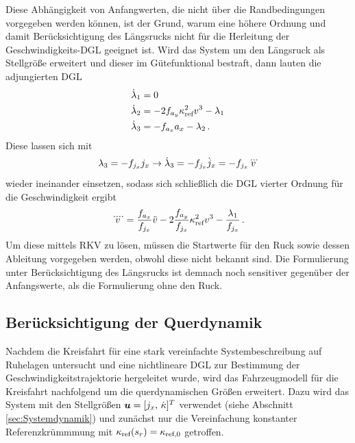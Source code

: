 Diese Abhängigkeit von Anfangwerten, die nicht über die Randbedingungen vorgegeben werden können, ist der Grund, warum eine höhere Ordnung und damit Berücksichtigung des Längsrucks nicht für die Herleitung der Geschwindigkeits-\gls{DGL} geeignet ist. Wird das System um den Längsruck als Stellgröße erweitert und dieser im Gütefunktional bestraft, dann lauten die adjungierten \gls{DGL}
\begin{align}
\dot{\lambda}_1 &= 0 \\
\dot{\lambda}_2 &= -2f_{a_y} \kappa_{\textrm{ref}}^2v^3 - \lambda_1 \\
\dot{\lambda}_3 &= -f_{a_x} a_x - \lambda_2\,.
\end{align}
Diese lassen sich mit 
\begin{equation}
\lambda_3 = -f_{j_x} j_x \rightarrow \dot{\lambda}_3 = -f_{j_x} \dot{j}_x = -f_{j_x} \dddot{v}
\end{equation}
wieder ineinander einsetzen, sodass sich schließlich die \gls{DGL} vierter Ordnung für die Geschwindigkeit ergibt
\begin{equation}
\ddddot{v} = \frac{f_{a_x}}{f_{j_x}}\ddot{v} - 2\frac{f_{a_y}}{f_{j_x}}\kappa_{\textrm{ref}}^2v^3 - \frac{\lambda_1}{f_{j_x}}\,. \label{eq:DGL_v_Kreisfahrt_vierte_ordnung}
\end{equation}
Um diese mittels \gls{RKV} zu lösen, müssen die Startwerte für den Ruck sowie dessen Ableitung vorgegeben werden, obwohl diese nicht bekannt sind. Die Formulierung unter Berücksichtigung des Längsrucks ist demnach noch sensitiver gegenüber der Anfangswerte, als die Formulierung ohne den Ruck.

\subsection{Berücksichtigung der Querdynamik}
Nachdem die Kreisfahrt für eine stark vereinfachte Systembeschreibung auf Ruhelagen untersucht und eine nichtlineare \gls{DGL} zur Bestimmung der Geschwindigkeitstrajektorie hergeleitet wurde, wird das Fahrzeugmodell für die Kreisfahrt nachfolgend um die querdynamischen Größen erweitert. Dazu wird das System mit den Stellgrößen $\boldsymbol{u} = [j_x,\,\dot{\kappa}]^T$ verwendet (siehe Abschnitt \ref{sec:Systemdynamik}) und zunächst nur die Vereinfachung konstanter Referenzkrümmmung mit $\kappa_{\textrm{ref}}(s_r)=\kappa_{\textrm{ref},0}$ getroffen. 

